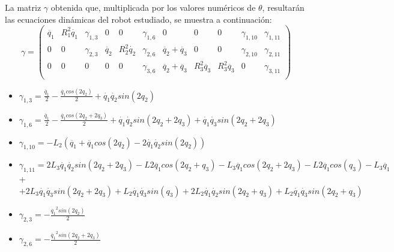 La matriz $\gamma$ obtenida que, multiplicada por los valores numéricos de $\theta$, resultarán las ecuaciones dinámicas del robot estudiado, se muestra a continuación:
\[
\gamma=
\begin{pmatrix}
\ddot{q_1} & R_{1}^{2}\dot{q_1} & \gamma_{1,3} & 0 & 0  & \gamma_{1,6} & 0 & 0 & 0 & \gamma_{1,10} & \gamma_{1,11} \\
0 & 0 & \gamma_{2,3} & \ddot{q_2} & R_{2}^{2}\dot{q_2} & \gamma_{2,6} & \ddot{q_2} + \ddot{q_3} & 0 & 0 & \gamma_{2,10} & \gamma_{2,11} \\
0 & 0 & 0 & 0 & 0 & \gamma_{3,6} & \ddot{q_2} + \ddot{q_3} & R_{3}^{2}\ddot{q_3} & R_{3}^{2}\ddot{q_3} & 0 & \gamma_{3,11} \\
\end{pmatrix} \] \vspace{0.3cm}
\begin{itemize}
\item $\gamma_{1,3}=\frac{\ddot{q_1}}{2} - \frac{\ddot{q_1}cos(2q_2)}{2} + \dot{q_1}\dot{q_2}sin(2q_2) $ \\ \vspace{0.2cm}
\item $\gamma_{1,6}=\frac{\ddot{q_1}}{2} - \frac{\ddot{q_1}cos(2q_2 + 2q_3)}{2} +\dot{q_1}\dot{q_2}sin(2q_2 + 2q_3) + \dot{q_1}\dot{q_3}sin(2q_2 + 2q_3) $\\ \vspace{0.2cm}
\item $\gamma_{1,10}=-L_{2}(\ddot{q_1} + \ddot{q_1}cos(2q_2) - 2\dot{q_1}\dot{q_2}sin(2q_2))$ \\ \vspace{0.2cm}
\item  $\gamma_{1,11}=2L_3\dot{q_1}\dot{q_2}sin(2q_2 + 2q_3) - L2\ddot{q_1}cos(2q_2 + q_3) - L_{3}\ddot{q_1}cos(2q_2 + 2q_3) - L2\ddot{q_1}cos(q_3) - L_{3}\ddot{q_1}$ + \\ \vspace{0.1cm}
	$+2L_{3}\dot{q_1}\dot{q_3}sin(2q_2 + 2q_3) + L_{2}\dot{q_1}\dot{q_3}sin(q_3) + 2L_{2}\dot{q_1}\dot{q_2}sin(2q_2 + q_3) + L_{2}\dot{q_1}\dot{q_3}sin(2q_2 + q_3)$ \\ \vspace{0.2cm}
\item $\gamma_{2,3}=-\frac{\dot{q_1}^{2}sin(2q_2)}{2} $\\ \vspace{0.2cm}
\item $\gamma_{2,6}=-\frac{\dot{q_1}^{2}sin(2q_2 + 2q_3)}{2} $\\ \vspace{0.2cm}

\end{itemize}

